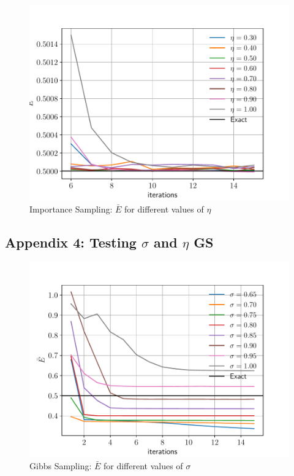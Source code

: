 \documentclass[%
oneside,                 %
final,                   %
10pt]{article}
\begin{document}
\begin{appendices}
\begin{figure}[!h]
        \centering 
         \includegraphics[scale=0.6]{../Results/sim_4/IS_eta.pdf} 
        \caption{Importance Sampling:  $\bar E$ for different values of $\eta$ }
        \label{fig:training_IS}   
\end{figure}  

\subsection{Appendix 4: Testing $\sigma$ and $\eta$ GS}
\begin{figure}[!h]
        \centering 
         \includegraphics[scale=0.6]{../Results/sim_7/GS_initial.pdf} 
        \caption{Gibbs Sampling:  $\bar E$ for different values of $\sigma$ }
        \label{fig:GS_sigma_initial}   
\end{figure}  


\end{appendices}
\end{document}
